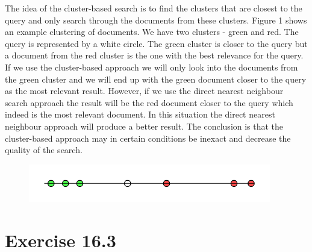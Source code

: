 \documentclass[a4paper, notitlepage]{article}
\begin{document}
The idea of the cluster-based search is to find the clusters that are closest to the query and only search through the documents from these clusters. Figure 1 shows an example clustering of documents. We have two clusters - green and red. The query is represented by a white circle. The green cluster is closer to the query but a document from the red cluster is the one with the best relevance for the query. If we use the cluster-based approach we will only look into the documents from the green cluster and we will end up with the green document closer to the query as the most relevant result. However, if we use the direct nearest neighbour search approach the result will be the red document closer to the query which indeed is the most relevant document. In this situation the direct nearest neighbour approach will produce a better result. The conclusion is that the cluster-based approach may in certain conditions be inexact and decrease the quality of the search.

\begin{figure}[H]
	\centering
	\includegraphics[]{Clustering.png}
	\caption{}
\end{figure}

\section{Exercise 16.3}
\end{document}
